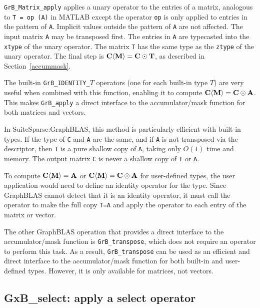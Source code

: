 \documentclass[12pt]{article}
\begin{document}
\verb'GrB_Matrix_apply'
applies a unary operator to the entries of a matrix, analogous to
\verb'T = op (A)'  in MATLAB except the operator \verb'op' is only applied to
entries in the pattern of \verb'A'.  Implicit values outside the pattern of
\verb'A' are not affected.  The input matrix \verb'A' may be transposed first.
The entries in \verb'A' are typecasted into the \verb'xtype' of the unary
operator.  The matrix \verb'T' has the same type as the \verb'ztype' of the
unary operator.  The final step is ${\bf C \langle M \rangle  = C \odot T}$, as
described in Section~\ref{accummask}.

The built-in \verb'GrB_IDENTITY_'$T$ operators (one for each built-in type $T$)
are very useful when combined with this function, enabling it to compute ${\bf
C \langle M \rangle  = C \odot A}$.  This makes \verb'GrB_apply' a direct
interface to the accumulator/mask function for both matrices and vectors.

In SuiteSparse:GraphBLAS, this method is particularly efficient with built-in
types.  If the type of \verb'C' and \verb'A' are the same, and if \verb'A' is
not transposed via the descriptor, then \verb'T' is a pure shallow copy of
\verb'A', taking only $O(1)$ time and memory.  The output matrix \verb'C' is
never a shallow copy of \verb'T' or \verb'A'.

To compute ${\bf C \langle M \rangle = A}$ or ${\bf C \langle M \rangle = C
\odot A}$ for user-defined types, the user application would need to define an
identity operator for the type.  Since GraphBLAS cannot detect that it is an
identity operator, it must call the operator to make the full copy \verb'T=A'
and apply the operator to each entry of the matrix or vector.

The other GraphBLAS operation that provides a direct interface to the
accumulator/mask function is \verb'GrB_transpose', which does not require an
operator to perform this task.  As a result, \verb'GrB_transpose' can be used
as an efficient and direct interface to the accumulator/mask function for
both built-in and user-defined types.  However, it is only available for
matrices, not vectors.

\newpage
\subsection{{\sf GxB\_select:} apply a select operator} %
\label{select}
\end{document}
